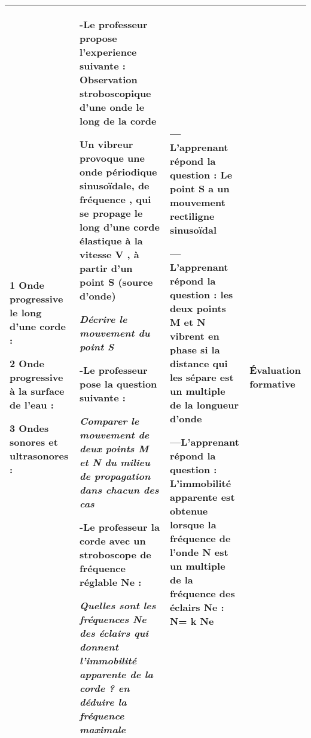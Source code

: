\documentclass[12pt]{article}
\begin{document}
\begin{center}
\begin{tabular}{|p{}||p{}||p{}||p{}|}
\color{red}{II- Exemples d’ondes mécaniques progressives périodiques :  }

\vspace{0.5cm}
\color{blue}1 Onde progressive le long d’une corde :
\vspace{0.5cm}

\color{blue}2
Onde progressive à la surface de l’eau :

\vspace{0.5cm}
\color{blue}3
Ondes sonores et ultrasonores :

\vspace{0.5cm}
\color{red}{III- Détermination expérimentale de la célérité de propagation
d’une onde sonore :  }

				  &
-Le professeur propose l'experience suivante : Observation stroboscopique d’une onde le long de la corde

Un vibreur provoque une onde périodique sinusoïdale, de fréquence , qui se propage le
long d’une corde élastique à la vitesse V , à partir d’un point S (source d’onde)

\emph{Décrire le mouvement du point S}

-Le professeur pose la question suivante :

\emph{Comparer le mouvement de deux points M et N du milieu de propagation dans chacun des cas }


-Le professeur la corde avec un stroboscope de fréquence réglable Ne :

\emph{Quelles sont les fréquences Ne des éclairs qui donnent l’immobilité apparente de la corde ? en
déduire la fréquence maximale }



				  &
				  --- L’apprenant répond la question :  Le point S a un mouvement rectiligne sinusoïdal
\vspace{0.5cm}

--- L’apprenant répond la question : les deux points M et N vibrent en phase
si la distance qui les sépare est un multiple de la longueur d’onde

\vspace{0.5cm}

---L’apprenant répond la question : L’immobilité apparente est obtenue lorsque la fréquence de l’onde N est un multiple de la
fréquence des éclairs Ne : N= k Ne
\vspace{0.2cm}

				  & 
	Évaluation formative\\\hline		  
\end{tabular}
\end{center}
\end{document}
